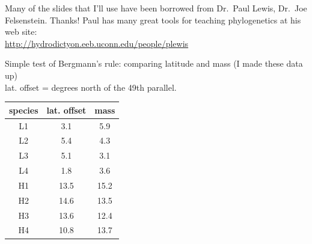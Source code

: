 \documentclass[landscape]{foils}
\begin{document}
\pagecolor{white}
\unitlength=1mm
\begin{center}
{\Large Many of the  slides that I'll use have been borrowed from Dr.\ Paul Lewis, Dr.\ Joe Felsenstein. Thanks!}
\vskip 15mm
\large Paul has many great tools for teaching phylogenetics at his web site: \\
\url{http://hydrodictyon.eeb.uconn.edu/people/plewis}
\end{center}


\myNewSlide
Simple test of Bergmann's rule: comparing latitude and mass (I made these data up)\\
\normalsize
lat. offset = degrees north of the 49th parallel.
\begin{table}[htdp]
\begin{center}
\begin{tabular}{|c|c|c|}
\hline
species & lat. offset & mass \\
\hline
L1 &  3.1 &  5.9 \\
L2 &  5.4  & 4.3 \\
L3 &  5.1 &  3.1 \\
L4 &  1.8 &  3.6 \\
H1 &  13.5  & 15.2 \\
H2 &  14.6 &  13.5 \\
H3 &  13.6 &  12.4 \\
H4 &  10.8 &  13.7 \\
\hline

\end{tabular}
\end{center}
\label{default}
\end{table}%
\myNewSlide
\end{document}

